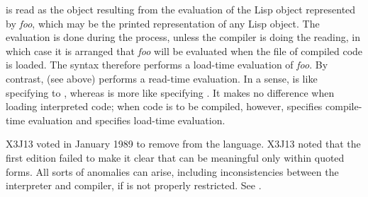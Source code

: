 \begin{obsolete}
\begin{flushdesc}
\item[\cd{\#,}]
 is read as the object resulting from the evaluation
of the Lisp object represented by {\it foo},
which may be the printed representation of any Lisp object.
The evaluation is done during the  process,
unless the compiler is doing the reading, in which case it is arranged
that {\it foo} will be evaluated when the file of compiled code is loaded.
The \cd{\#,} syntax therefore performs a load-time evaluation of {\it foo}.
By contrast,  (see above) performs a read-time evaluation.
In a sense, \cd{\#,} is like specifying  to
, whereas  is more like specifying .
It makes no difference when loading interpreted code; when code
is to be compiled, however,  specifies compile-time evaluation and
\cd{\#,} specifies load-time evaluation.
\end{flushdesc}
\end{obsolete}

\begin{new}
X3J13 voted in January 1989
to remove \cd{\#,} from the language.
X3J13 noted that the first edition failed to make it clear that \cd{\#,}
can be meaningful only within quoted forms.  All sorts of anomalies can arise,
including inconsistencies between the interpreter and compiler, if \cd{\#,}
is not properly restricted.  See .
\end{new}

